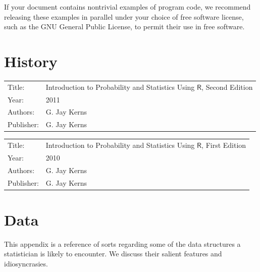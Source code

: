 \documentclass[captions=tableheading]{scrbook}
\begin{document}
\begin{example}
If your document contains nontrivial examples of program code, we recommend releasing these examples in parallel under your choice of free software license, such as the GNU General Public License, to permit their use in free software. 
\chapter{History}
\label{sec-19}
\label{cha-History}



\begin{center}
\begin{tabular}{ll}
 Title:      &  Introduction to Probability and Statistics Using \(\mathsf{R}\), Second Edition  \\
 Year:       &  2011                                                                             \\
 Authors:    &  G. Jay Kerns                                                                     \\
 Publisher:  &  G. Jay Kerns                                                                     \\
\end{tabular}
\end{center}



\vfill{}


\begin{center}
\begin{tabular}{ll}
 Title:      &  Introduction to Probability and Statistics Using \(\mathsf{R}\), First Edition  \\
 Year:       &  2010                                                                            \\
 Authors:    &  G. Jay Kerns                                                                    \\
 Publisher:  &  G. Jay Kerns                                                                    \\
\end{tabular}
\end{center}
\chapter{Data}
\label{sec-20}
\label{cha-data}


This appendix is a reference of sorts regarding some of the data structures a statistician is likely to encounter. We discuss their salient features and idiosyncrasies.

\end{example}
\end{document}
